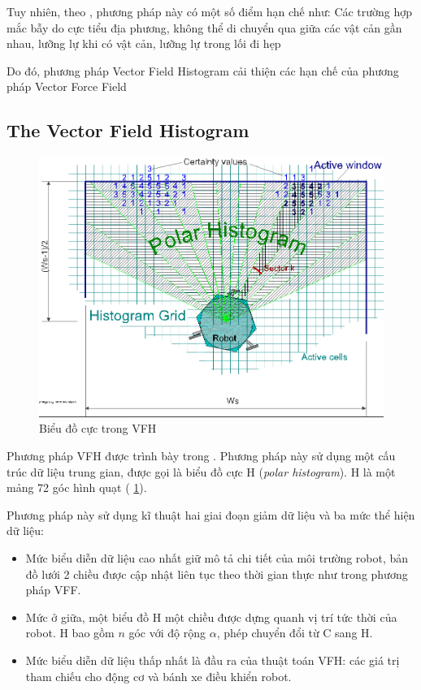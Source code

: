 Tuy nhiên, theo \cite{Koren1991}, phương pháp này có một số điểm hạn chế như: Các trường hợp mắc bẫy do cực tiểu địa phương, không thể di chuyển qua giữa các vật cản gần nhau, lưỡng lự khi có vật cản, lưỡng lự trong lối đi hẹp

Do đó, phương pháp Vector Field Histogram cải thiện các hạn chế của phương pháp Vector Force Field

\subsection{The Vector Field Histogram}
\label{sub:VFH}

\begin{figure}[htbp]
  \centering
  \includegraphics[width=0.6\linewidth]{figures/VFH-PolarHistogram.png}
  \caption{Biểu đồ cực trong VFH}
  \label{fig:PolarHistogram}
\end{figure}

Phương pháp VFH được trình bày trong \cite{Borenstein1991}. Phương pháp này sử dụng một cấu trúc dữ liệu trung gian, được gọi là biểu đồ cực H (\textit{polar histogram}). H là một mảng 72 góc hình quạt (\figurename{ \ref{fig:PolarHistogram}}).

Phương pháp này sử dụng kĩ thuật hai giai đoạn giảm dữ liệu và ba mức thể hiện dữ liệu:

\begin{itemize}
  \item Mức biểu diễn dữ liệu cao nhất giữ mô tả chi tiết của môi trường robot, bản đồ lưới 2 chiều được cập nhật liên tục theo thời gian thực như trong phương pháp VFF.
  \item Mức ở giữa, một biểu đồ H một chiều được dựng quanh vị trí tức thời của robot. H bao gồm $n$ góc với độ rộng $\alpha$, phép chuyển đổi từ C sang H.
  \item Mức biểu diễn dữ liệu thấp nhất là đầu ra của thuật toán VFH: các giá trị tham chiếu cho động cơ và bánh xe điều khiển robot.
\end{itemize}

